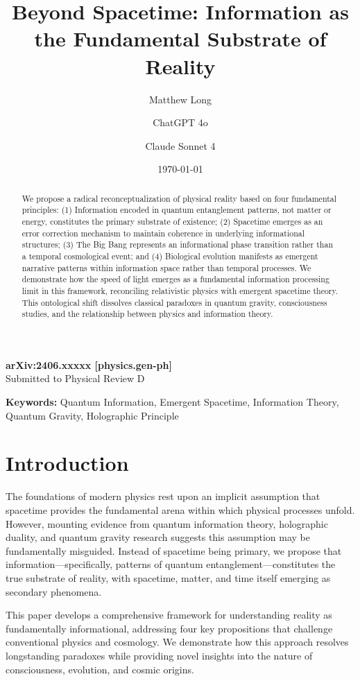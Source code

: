 \documentclass[12pt]{article}
\title{Beyond Spacetime: Information as the Fundamental Substrate of Reality}
\author[1]{Matthew Long}
\author[2]{ChatGPT 4o}
\author[3]{Claude Sonnet 4}
\affil[1]{Yoneda AI}
\affil[2]{OpenAI}
\affil[3]{Anthropic}
\date{\today}
\newcommand{\arxivheader}{
\begin{center}
{\large \textbf{arXiv:2406.xxxxx [physics.gen-ph]}}\\
\vspace{0.5em}
{\large Submitted to Physical Review D}
\end{center}
}
\newcommand{\keywords}[1]{\vspace{1em}\noindent\textbf{Keywords:} #1}
\begin{document}
\arxivheader

\maketitle

\begin{abstract}
We propose a radical reconceptualization of physical reality based on four fundamental principles: (1) Information encoded in quantum entanglement patterns, not matter or energy, constitutes the primary substrate of existence; (2) Spacetime emerges as an error correction mechanism to maintain coherence in underlying informational structures; (3) The Big Bang represents an informational phase transition rather than a temporal cosmological event; and (4) Biological evolution manifests as emergent narrative patterns within information space rather than temporal processes. We demonstrate how the speed of light emerges as a fundamental information processing limit in this framework, reconciling relativistic physics with emergent spacetime theory. This ontological shift dissolves classical paradoxes in quantum gravity, consciousness studies, and the relationship between physics and information theory.
\end{abstract}

\keywords{Quantum Information, Emergent Spacetime, Information Theory, Quantum Gravity, Holographic Principle}

\onehalfspacing

\section{Introduction}

The foundations of modern physics rest upon an implicit assumption that spacetime provides the fundamental arena within which physical processes unfold. However, mounting evidence from quantum information theory, holographic duality, and quantum gravity research suggests this assumption may be fundamentally misguided. Instead of spacetime being primary, we propose that information—specifically, patterns of quantum entanglement—constitutes the true substrate of reality, with spacetime, matter, and time itself emerging as secondary phenomena.

This paper develops a comprehensive framework for understanding reality as fundamentally informational, addressing four key propositions that challenge conventional physics and cosmology. We demonstrate how this approach resolves longstanding paradoxes while providing novel insights into the nature of consciousness, evolution, and cosmic origins.
\end{document}
